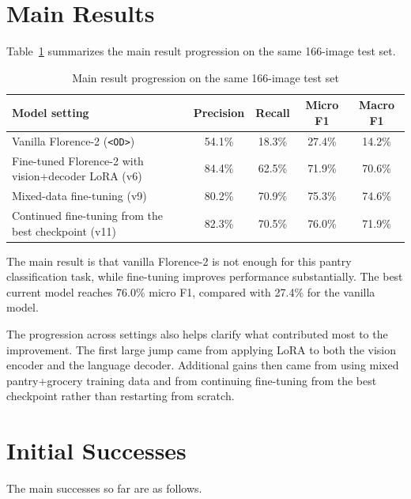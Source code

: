 \documentclass[11pt]{article}
\begin{document}
\section{Main Results}

Table~\ref{tab:mainresults} summarizes the main result progression on the same 166-image test set.

\begin{table}[h]
\centering
\caption{Main result progression on the same 166-image test set}
\label{tab:mainresults}
\begin{tabular}{lcccc}
\toprule
Model setting & Precision & Recall & Micro F1 & Macro F1 \\
\midrule
Vanilla Florence-2 (\texttt{<OD>}) & 54.1\% & 18.3\% & 27.4\% & 14.2\% \\
Fine-tuned Florence-2 with vision+decoder LoRA (v6) & 84.4\% & 62.5\% & 71.9\% & 70.6\% \\
Mixed-data fine-tuning (v9) & 80.2\% & 70.9\% & 75.3\% & 74.6\% \\
Continued fine-tuning from the best checkpoint (v11) & 82.3\% & 70.5\% & 76.0\% & 71.9\% \\
\bottomrule
\end{tabular}
\end{table}

The main result is that vanilla Florence-2 is not enough for this pantry classification task, while fine-tuning improves performance substantially. The best current model reaches 76.0\% micro F1, compared with 27.4\% for the vanilla model.

The progression across settings also helps clarify what contributed most to the improvement. The first large jump came from applying LoRA to both the vision encoder and the language decoder. Additional gains then came from using mixed pantry+grocery training data and from continuing fine-tuning from the best checkpoint rather than restarting from scratch.

\section{Initial Successes}

The main successes so far are as follows.
\end{document}
